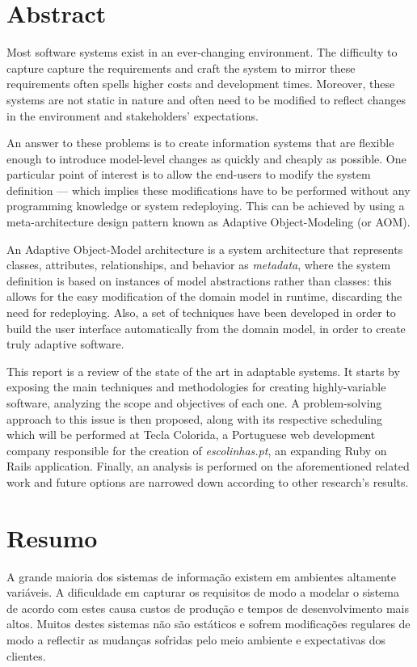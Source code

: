 \chapter*{Abstract}

Most software systems exist in an ever-changing environment. The difficulty to capture capture the requirements and craft the system to mirror these requirements often spells higher costs and development times. Moreover, these systems are not static in nature and often need to be modified to reflect changes in the environment and stakeholders' expectations.

An answer to these problems is to create information systems that are flexible enough to introduce model-level changes as quickly and cheaply as possible. One particular point of interest is to allow the end-users to modify the system definition --- which implies these modifications have to be performed without any programming knowledge or system redeploying. This can be achieved by using a meta-architecture design pattern known as Adaptive Object-Modeling (or AOM).

An Adaptive Object-Model architecture is a system architecture that represents classes, attributes, relationships, and behavior as \emph{metadata}, where the system definition is based on instances of model abstractions rather than classes: this allows for the easy modification of the domain model in runtime, discarding the need for redeploying. Also, a set of techniques have been developed in order to build the user interface automatically from the domain model, in order to create truly adaptive software.

This report is a review of the state of the art in adaptable systems. It starts by exposing the main techniques and methodologies for creating highly-variable software, analyzing the scope and objectives of each one. A problem-solving approach to this issue is then proposed, along with its respective scheduling which will be performed at Tecla Colorida, a Portuguese web development company responsible for the creation of \emph{escolinhas.pt}, an expanding Ruby on Rails application. Finally, an analysis is performed on the aforementioned related work and future options are narrowed down according to other research's results.

\chapter*{Resumo}

A grande maioria dos sistemas de informação existem em ambientes altamente variáveis. A dificuldade em capturar os requisitos de modo a modelar o sistema de acordo com estes causa custos de produção e tempos de desenvolvimento mais altos. Muitos destes sistemas não são estáticos e sofrem modificações regulares de modo a reflectir as mudanças sofridas pelo meio ambiente e expectativas dos clientes.

